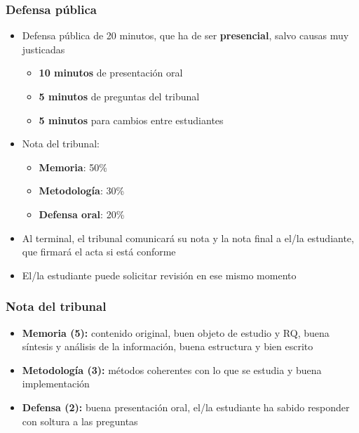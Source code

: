 \documentclass[aspectratio=43]{beamer}
\begin{document}
\begin{frame}
\frametitle{Defensa pública}
\centering

\begin{itemize}
  \item Defensa pública de 20 minutos, que ha de ser \textbf{presencial}, salvo causas muy justicadas
  \begin{itemize}
    \item \textbf{10 minutos} de presentación oral
    \item \textbf{5 minutos} de preguntas del tribunal
    \item \textbf{5 minutos} para cambios entre estudiantes
  \end{itemize}
  \item Nota del tribunal:
  \begin{itemize}
    \item \textbf{Memoria}: 50\%
    \item \textbf{Metodología}: 30\%
    \item \textbf{Defensa oral}: 20\%
  \end{itemize}
  \item Al terminal, el tribunal comunicará su nota y la nota final a el/la estudiante, que firmará el acta si está conforme
  \item El/la estudiante puede solicitar revisión en ese mismo momento
\end{itemize}

\end{frame}

\begin{frame}
\frametitle{Nota del tribunal}
\centering

\begin{itemize}
  \item \textbf{Memoria (5):} contenido original, buen objeto de estudio y RQ, buena síntesis y análisis de la información, buena estructura y bien escrito
  \item \textbf{Metodología (3):} métodos coherentes con lo que se estudia y buena implementación
  \item \textbf{Defensa (2):} buena presentación oral, el/la estudiante ha sabido responder con soltura a las preguntas
\end{itemize}

\end{frame}
\end{document}
